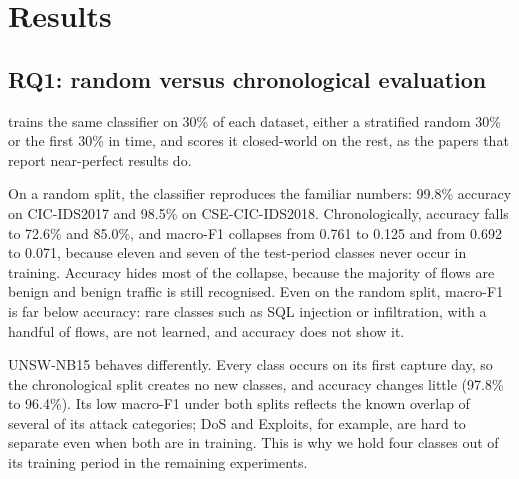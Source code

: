 \section{Results}
\label{sec:results}

\subsection{RQ1: random versus chronological evaluation}
\label{sec:res-split}
 trains the same classifier on 30\% of each dataset, either a stratified random 30\% or the first
30\% in time, and scores it closed-world on the rest, as the papers that report near-perfect results do.

On a random split, the classifier reproduces the familiar numbers: 99.8\% accuracy on CIC-IDS2017 and 98.5\% on
CSE-CIC-IDS2018. Chronologically, accuracy falls to 72.6\% and 85.0\%, and macro-F1 collapses from 0.761 to 0.125
and from 0.692 to 0.071, because eleven and seven of the test-period classes never occur in training. Accuracy
hides most of the collapse, because the majority of flows are benign and benign traffic is still recognised.
Even on the random split, macro-F1 is far below accuracy: rare classes such as SQL injection or infiltration, with a
handful of flows, are not learned, and accuracy does not show it.

UNSW-NB15 behaves differently. Every class occurs on its first capture day, so the chronological split creates no
new classes, and accuracy changes little (97.8\% to 96.4\%). Its low macro-F1 under both splits reflects the
known overlap of several of its attack categories; DoS and Exploits, for example, are hard to separate even when
both are in training. This is why we hold four classes out of its training period in the remaining experiments.

\begin{table}[t]
\centering
\caption{The same classifier on a random and a chronological 30/70 split (closed-world scoring, no \unk{}).
Random split: mean of three seeds (standard deviation $\le 0.018$).}
\label{tab:split}
\small
{}
\end{table}

